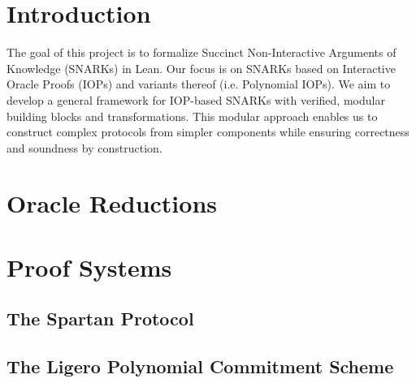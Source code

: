 %

\chapter{Introduction}

The goal of this project is to formalize Succinct Non-Interactive Arguments of Knowledge (SNARKs) in
Lean. Our focus is on SNARKs based on Interactive Oracle Proofs (IOPs) and variants thereof (i.e.
Polynomial IOPs). We aim to develop a general framework for IOP-based SNARKs with verified, modular
building blocks and transformations. This modular approach enables us to construct complex protocols
from simpler components while ensuring correctness and soundness by construction.

\chapter{Oracle Reductions}\label{chap:oracle_reductions}





\chapter{Proof Systems}\label{chap:proof_systems}





\section{The Spartan Protocol}

\section{The Ligero Polynomial Commitment Scheme}

